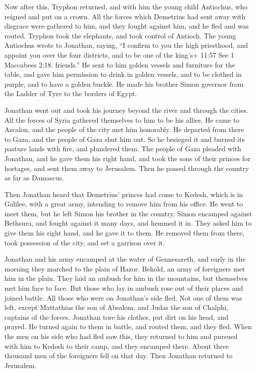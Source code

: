  Now after this, Tryphon returned, and with him the young
child Antiochus, who reigned and put on a crown.  All the
forces which Demetrius had sent away with disgrace were gathered to him,
and they fought against him, and he fled and was routed. 
Tryphon took the elephants, and took control of Antioch. 
The young Antiochus wrote to Jonathan, saying, ``I confirm to you the
high priesthood, and appoint you over the four districts, and to be one
of the king's+ 11:57 See 1 Maccabees 2:18. friends.''  He
sent to him golden vessels and furniture for the table, and gave him
permission to drink in golden vessels, and to be clothed in purple, and
to have a golden buckle.  He made his brother Simon
governor from the Ladder of Tyre to the borders of Egypt.

 Jonathan went out and took his journey beyond the river
and through the cities. All the forces of Syria gathered themselves to
him to be his allies. He came to Ascalon, and the people of the city met
him honorably.  He departed from there to Gaza, and the
people of Gaza shut him out. So he besieged it and burned its pasture
lands with fire, and plundered them.  The people of Gaza
pleaded with Jonathan, and he gave them his right hand, and took the
sons of their princes for hostages, and sent them away to Jerusalem.
Then he passed through the country as far as Damascus.

 Then Jonathan heard that Demetrius' princes had come to
Kedesh, which is in Galilee, with a great army, intending to remove him
from his office.  He went to meet them, but he left Simon
his brother in the country.  Simon encamped against
Bethsura, and fought against it many days, and hemmed it in.
 They asked him to give them his right hand, and he gave it
to them. He removed them from there, took possession of the city, and
set a garrison over it.

 Jonathan and his army encamped at the water of
Gennesareth, and early in the morning they marched to the plain of
Hazor.  Behold, an army of foreigners met him in the plain.
They laid an ambush for him in the mountains, but themselves met him
face to face.  But those who lay in ambush rose out of
their places and joined battle. All those who were on Jonathan's side
fled.  Not one of them was left, except Mattathias the son
of Absalom, and Judas the son of Chalphi, captains of the forces.
 Jonathan tore his clothes, put dirt on his head, and
prayed.  He turned again to them in battle, and routed
them, and they fled.  When the men on his side who had fled
saw this, they returned to him and pursued with him to Kedesh to their
camp, and they encamped there.  About three thousand men of
the foreigners fell on that day. Then Jonathan returned to Jerusalem.

